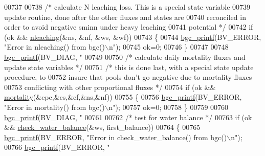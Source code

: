 \begin{DoxyCode}
{{{{{{{{{{{{{{{{{{{{{{{{{00737 
00738             \textcolor{comment}{/* calculate N leaching loss.  This is a special state variable}
00739 \textcolor{comment}{            update routine, done after the other fluxes and states are}
00740 \textcolor{comment}{            reconciled in order to avoid negative sminn under heavy leaching}
00741 \textcolor{comment}{            potential */}
00742             \textcolor{keywordflow}{if} (ok && \hyperlink{nleaching_8c_ad81692b3f3f9e1a81bb29c1d0ce6bd3d}{nleaching}(&ns, &nf, &ws, &wf))
00743             \{
00744                 \hyperlink{bgc__io_8c_af287cce6e2aede1ce337de9319e80d0d}{bgc\_printf}(BV\_ERROR, \textcolor{stringliteral}{"Error in nleaching() from bgc()\(\backslash\)n"});
00745                 ok=0;
00746             \}
00747             
00748             \hyperlink{bgc__io_8c_af287cce6e2aede1ce337de9319e80d0d}{bgc\_printf}(BV\_DIAG, \textcolor{stringliteral}{"%
00749 
00750             \textcolor{comment}{/* calculate daily mortality fluxes and update state variables */}
00751             \textcolor{comment}{/* this is done last, with a special state update procedure, to}
00752 \textcolor{comment}{            insure that pools don't go negative due to mortality fluxes}
00753 \textcolor{comment}{            conflicting with other proportional fluxes */}
00754             \textcolor{keywordflow}{if} (ok && \hyperlink{mortality_8c_ada5c305af17e64ee9f82e82235340734}{mortality}(&epc,&cs,&cf,&ns,&nf))
00755             \{
00756                 \hyperlink{bgc__io_8c_af287cce6e2aede1ce337de9319e80d0d}{bgc\_printf}(BV\_ERROR, \textcolor{stringliteral}{"Error in mortality() from bgc()\(\backslash\)n"});
00757                 ok=0;
00758             \}
00759             
00760             \hyperlink{bgc__io_8c_af287cce6e2aede1ce337de9319e80d0d}{bgc\_printf}(BV\_DIAG, \textcolor{stringliteral}{"%
00761 
00762             \textcolor{comment}{/* test for water balance */}
00763             \textcolor{keywordflow}{if} (ok && \hyperlink{check__balance_8c_a7c3407e1cb5eb1e58ac2ac744a6156d6}{check\_water\_balance}(&ws, first\_balance))
00764             \{
00765                 \hyperlink{bgc__io_8c_af287cce6e2aede1ce337de9319e80d0d}{bgc\_printf}(BV\_ERROR, \textcolor{stringliteral}{"Error in check\_water\_balance() from bgc()\(\backslash\)n"});
00766                 \hyperlink{bgc__io_8c_af287cce6e2aede1ce337de9319e80d0d}{bgc\_printf}(BV\_ERROR, \textcolor{stringliteral}{"%
}}}}}}}}}}}}}}}}}}}}}}}}}}}}
\end{DoxyCode}
